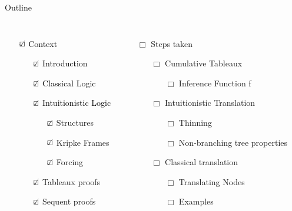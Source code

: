 \documentclass{beamer}
\begin{document}
\begin{frame}{Outline}
    \begin{columns}
        \begin{itemize}
            \item[$\textcolor{black}{\CheckedBox}$] \textcolor{black}{Context}
            \begin{itemize}
                \item[$\textcolor{black}{\CheckedBox}$] \textcolor{black}{Introduction}
                \item[$\textcolor{black}{\CheckedBox}$] \textcolor{black}{Classical Logic}
                \item[$\textcolor{black}{\CheckedBox}$] \textcolor{black}{Intuitionistic Logic}
                \begin{itemize}
                    \item[$\textcolor{black}\CheckedBox$] Structures
                    \item[$\textcolor{black}\CheckedBox$] Kripke Frames
                    \item[$\textcolor{black}\CheckedBox$] Forcing
                \end{itemize}
                \item[$\textcolor{black}\CheckedBox$] Tableaux proofs
                \item[$\textcolor{black}\CheckedBox$] Sequent proofs
            \end{itemize}
        \end{itemize}
        \begin{itemize}
            \item[${\Box}$] {Steps taken}
            \begin{itemize}
                \item[${\Box}$] {Cumulative Tableaux}
                \begin{itemize}
                    \item[${\Box}$] {Inference Function f}
                \end{itemize}
                \item[${\Box}$] {Intuitionistic Translation}
                \begin{itemize}
                    \item[${\Box}$] {Thinning }
                    \item[${\Box}$] {Non-branching tree properties}
                \end{itemize}
                \item[${\Box}$] {Classical translation}
                \begin{itemize}
                    \item[${\Box}$] {Translating Nodes }
                    \item[${\Box}$] {Examples}
                \end{itemize}
                

\end{itemize}
\end{itemize}
\end{columns}
\end{frame}
\end{document}
